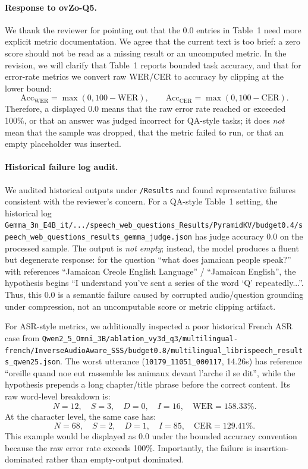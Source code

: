 \begin{answer}

    \paragraph{Response to ovZo-Q5.}
    We thank the reviewer for pointing out that the 0.0 entries in Table~1 need more explicit metric documentation.
    We agree that the current text is too brief: a zero score should not be read as a missing result or an uncomputed metric.
    In the revision, we will clarify that Table~1 reports bounded task accuracy, and that for error-rate metrics we convert raw WER/CER to accuracy by clipping at the lower bound:
    \[
        \mathrm{Acc}_{\mathrm{WER}}=\max(0, 100-\mathrm{WER}), \qquad
        \mathrm{Acc}_{\mathrm{CER}}=\max(0, 100-\mathrm{CER}).
    \]
    Therefore, a displayed 0.0 means that the raw error rate reached or exceeded 100\%, or that an answer was judged incorrect for QA-style tasks; it does \emph{not} mean that the sample was dropped, that the metric failed to run, or that an empty placeholder was inserted.

    \paragraph{Historical failure log audit.}
    We audited historical outputs under \texttt{/Results} and found representative failures consistent with the reviewer's concern.
    For a QA-style Table~1 setting, the historical log
    \texttt{Gemma\_3n\_E4B\_it/.../speech\_web\_questions\_Results/PyramidKV/budget0.4/speech\_web\_questions\_results\_gemma\_judge.json}
    has judge accuracy 0.0 on the processed sample.
    The output is \emph{not empty}; instead, the model produces a fluent but degenerate response: for the question ``what does jamaican people speak?'' with references ``Jamaican Creole English Language'' / ``Jamaican English'', the hypothesis begins ``I understand you've sent a series of the word `Q' repeatedly...''.
    Thus, this 0.0 is a semantic failure caused by corrupted audio/question grounding under compression, not an uncomputable score or metric clipping artifact.

    For ASR-style metrics, we additionally inspected a poor historical French ASR case from
    \texttt{Qwen2\_5\_Omni\_3B/ablation\_vy3d\_q3/multilingual-french/InverseAudioAware\_SSS/budget0.8/multilingual\_librispeech\_results\_qwen25.json}.
    The worst utterance (\texttt{10179\_11051\_000117}, 14.26s) has reference ``oreille quand noe eut rassemble les animaux devant l'arche il se dit'', while the hypothesis prepends a long chapter/title phrase before the correct content.
    Its raw word-level breakdown is:
    \[
        N=12,\quad S=3,\quad D=0,\quad I=16,\quad \mathrm{WER}=158.33\%.
    \]
    At the character level, the same case has:
    \[
        N=68,\quad S=2,\quad D=1,\quad I=85,\quad \mathrm{CER}=129.41\%.
    \]
    This example would be displayed as 0.0 under the bounded accuracy convention because the raw error rate exceeds 100\%.
    Importantly, the failure is insertion-dominated rather than empty-output dominated.


\end{answer}
